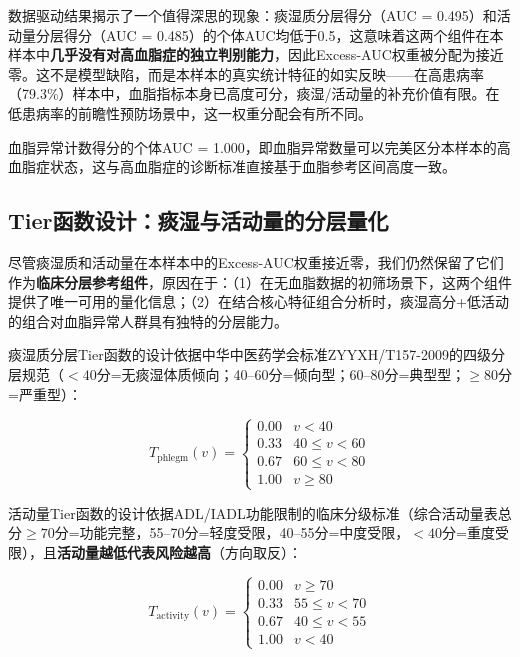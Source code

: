 \documentclass[12pt,a4paper]{ctexart}
\begin{document}
数据驱动结果揭示了一个值得深思的现象：痰湿质分层得分（AUC = 0.495）和活动量分层得分（AUC = 0.485）的个体AUC均低于0.5，这意味着这两个组件在本样本中\textbf{几乎没有对高血脂症的独立判别能力}，因此Excess-AUC权重被分配为接近零。这不是模型缺陷，而是本样本的真实统计特征的如实反映——在高患病率（79.3\%）样本中，血脂指标本身已高度可分，痰湿/活动量的补充价值有限。在低患病率的前瞻性预防场景中，这一权重分配会有所不同。

血脂异常计数得分的个体AUC = 1.000，即血脂异常数量可以完美区分本样本的高血脂症状态，这与高血脂症的诊断标准直接基于血脂参考区间高度一致。

\subsection{Tier函数设计：痰湿与活动量的分层量化}

尽管痰湿质和活动量在本样本中的Excess-AUC权重接近零，我们仍然保留了它们作为\textbf{临床分层参考组件}，原因在于：（1）在无血脂数据的初筛场景下，这两个组件提供了唯一可用的量化信息；（2）在结合核心特征组合分析时，痰湿高分+低活动的组合对血脂异常人群具有独特的分层能力。

痰湿质分层Tier函数的设计依据中华中医药学会标准ZYYXH/T157-2009的四级分层规范（$<40$分=无痰湿体质倾向；40--60分=倾向型；60--80分=典型型；$\geq 80$分=严重型）：

\begin{equation}
T_{\text{phlegm}}(v) = \begin{cases}
0.00 & v < 40 \\
0.33 & 40 \leq v < 60 \\
0.67 & 60 \leq v < 80 \\
1.00 & v \geq 80
\end{cases}
\label{eq:tier_phlegm}
\end{equation}

活动量Tier函数的设计依据ADL/IADL功能限制的临床分级标准（综合活动量表总分$\geq 70$分=功能完整，55--70分=轻度受限，40--55分=中度受限，$<40$分=重度受限），且\textbf{活动量越低代表风险越高}（方向取反）：

\begin{equation}
T_{\text{activity}}(v) = \begin{cases}
0.00 & v \geq 70 \\
0.33 & 55 \leq v < 70 \\
0.67 & 40 \leq v < 55 \\
1.00 & v < 40
\end{cases}
\label{eq:tier_activity}
\end{equation}
\end{document}
